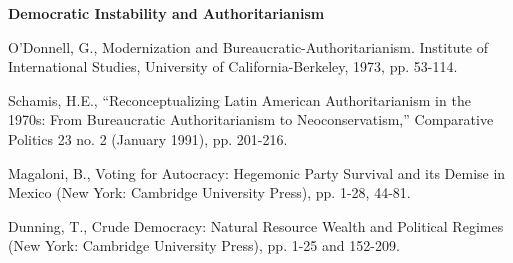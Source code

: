 \documentclass[letterpaper]{article}
\renewenvironment{itemize}{
  \begin{list}{}{
    \setlength{\leftmargin}{1.5em}
  }
}{
  \end{list}
}
\begin{document}
\begin{enumerate}
\item {\bf Democratic Instability and Authoritarianism}
	\begin{itemize}
		\item[$\bullet$] O'Donnell, G., Modernization and Bureaucratic-Authoritarianism. Institute of International Studies, University of California-Berkeley, 1973, pp. 53-114.
		\item[$\bullet$] Schamis, H.E., ``Reconceptualizing Latin American Authoritarianism in the 1970s: From Bureaucratic Authoritarianism to Neoconservatism,'' Comparative Politics 23 no. 2 (January 1991), pp. 201-216.
		\item[$\bullet$] Magaloni, B., Voting for Autocracy: Hegemonic Party Survival and its Demise in Mexico (New York: Cambridge University Press), pp. 1-28, 44-81.
		\item[$\bullet$] Dunning, T., Crude Democracy: Natural Resource Wealth and Political Regimes (New York: Cambridge University Press), pp. 1-25 and 152-209.
	\end{itemize}




\end{enumerate}
\end{document}
